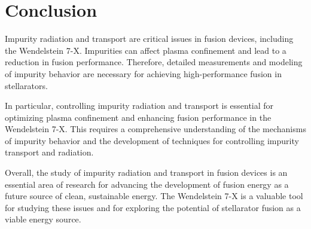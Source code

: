\documentclass[12pt]{article}
\begin{document}
\section{Conclusion}

Impurity radiation and transport are critical issues in fusion devices, including the Wendelstein 7-X. Impurities can affect plasma confinement and lead to a reduction in fusion performance. Therefore, detailed measurements and modeling of impurity behavior are necessary for achieving high-performance fusion in stellarators.

In particular, controlling impurity radiation and transport is essential for optimizing plasma confinement and enhancing fusion performance in the Wendelstein 7-X. This requires a comprehensive understanding of the mechanisms of impurity behavior and the development of techniques for controlling impurity transport and radiation.

Overall, the study of impurity radiation and transport in fusion devices is an essential area of research for advancing the development of fusion energy as a future source of clean, sustainable energy. The Wendelstein 7-X is a valuable tool for studying these issues and for exploring the potential of stellarator fusion as a viable energy source.



\end{document}
